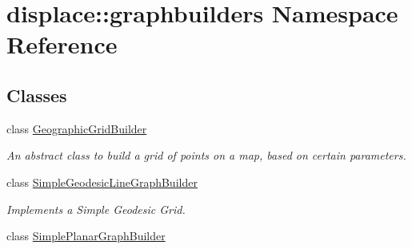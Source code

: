 \hypertarget{namespacedisplace_1_1graphbuilders}{}\section{displace\+::graphbuilders Namespace Reference}
\label{namespacedisplace_1_1graphbuilders}
\subsection*{Classes}
\begin{DoxyCompactItemize}
\item 
class \mbox{\hyperlink{classdisplace_1_1graphbuilders_1_1_geographic_grid_builder}{Geographic\+Grid\+Builder}}
\begin{DoxyCompactList}\small\item\em An abstract class to build a grid of points on a map, based on certain parameters. \end{DoxyCompactList}\item 
class \mbox{\hyperlink{classdisplace_1_1graphbuilders_1_1_simple_geodesic_line_graph_builder}{Simple\+Geodesic\+Line\+Graph\+Builder}}
\begin{DoxyCompactList}\small\item\em Implements a Simple Geodesic Grid. \end{DoxyCompactList}\item 
class \mbox{\hyperlink{classdisplace_1_1graphbuilders_1_1_simple_planar_graph_builder}{Simple\+Planar\+Graph\+Builder}}
\end{DoxyCompactItemize}
